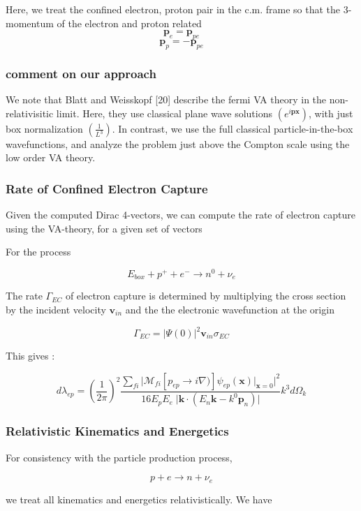 \documentclass[11pt]{amsart}
\begin{document}
Here, we treat the confined electron, proton pair in the c.m. frame so that the 3-momentum of the electron and proton related
$$\mathbf{p}_{e}=\mathbf{p}_{pe}$$
$$\mathbf{p}_{p}=-\mathbf{p}_{pe}$$

\subsubsection{comment on our approach}

We note that Blatt and Weisskopf [20] describe the fermi VA theory in the non-relativisitic limit.  Here, they use classical plane wave solutions $(e^{i\mathbf{p}\mathbf{x}})$, with just box normalization $(\frac{1}{L^{3}})$.  In contrast, we use the full classical particle-in-the-box wavefunctions, and analyze the problem just above the Compton scale using the low order VA theory.

\subsubsection{Rate of Confined Electron Capture}

Given the computed Dirac 4-vectors, we can compute the rate of electron capture using the VA-theory, for a given set of vectors

For the process

$$E_{box}+p^{+}+e^{-}\rightarrow n^{0}+\nu_{e}$$

The rate $\Gamma_{EC}$ of electron capture is determined by multiplying the cross section by the incident velocity $\mathbf{v}_{in}$ and the the electronic wavefunction at the origin 

$$\Gamma_{EC}=\big\vert\Psi(0)\big\vert^{2}\mathbf{v}_{in}\sigma_{EC}$$

This gives :

$$d\lambda_{ep}=\left(\dfrac{1}{2\pi}\right)^{2}\dfrac{\sum_{fi}\big\vert\mathcal{M}_{fi}\left[p_{ep}\rightarrow i\nabla)\right]\psi_{ep}(\mathbf{x})\big\vert_{\mathbf{x}=0}\big\vert^{2}}{16E_{p}E_{e}\;\big\vert\mathbf{k}\cdot(E{_n}\mathbf{k}-k^{0}\mathbf{p}_{n})\big\vert}k^{3}d\Omega_{k}$$


\subsubsection{Relativistic Kinematics and Energetics}
For consistency with the particle production process,

$$ p+e\rightarrow n+\nu_{e} $$

we treat all kinematics and energetics relativistically.  We have
\end{document}
